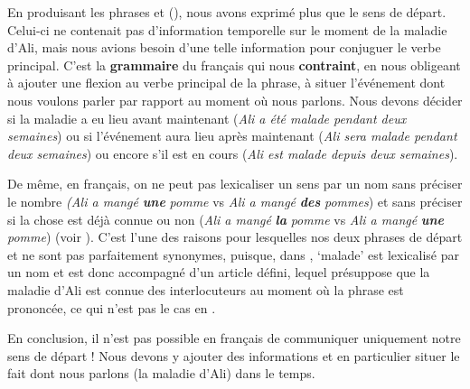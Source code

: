En produisant les phrases  et  (), nous avons exprimé plus que le sens de départ. Celui-ci ne contenait pas d’information temporelle sur le moment de la maladie d’Ali, mais nous avions besoin d’une telle information pour conjuguer le verbe principal. C’est la \textbf{grammaire} du français qui nous \textbf{contraint}, en nous obligeant à ajouter une flexion au verbe principal de la phrase, à situer l’événement dont nous voulons parler par rapport au moment où nous parlons. Nous devons décider si la maladie a eu lieu avant maintenant (\textit{Ali a été malade pendant deux semaines}) ou si l’événement aura lieu après maintenant (\textit{Ali sera malade pendant deux semaines}) ou encore s’il est en cours (\textit{Ali est malade depuis deux semaines}).

De même, en français, on ne peut pas lexicaliser un sens par un nom sans préciser le nombre \textit{(Ali a mangé} \textbf{\textit{une}} \textit{pomme} vs \textit{Ali a mangé} \textbf{\textit{des}} \textit{pommes}) et sans préciser si la chose est déjà connue ou non (\textit{Ali a mangé} \textbf{\textit{la}} \textit{pomme} vs \textit{Ali a mangé} \textbf{\textit{une}} \textit{pomme}) (voir ). C’est l’une des raisons pour lesquelles nos deux phrases de départ  et  ne sont pas parfaitement synonymes, puisque, dans , ‘malade’ est lexicalisé par un nom et est donc accompagné d’un article défini, lequel présuppose que la maladie d’Ali est connue des interlocuteurs au moment où la phrase est prononcée, ce qui n’est pas le cas en .

En conclusion, il n’est pas possible en français de communiquer uniquement notre sens de départ ! Nous devons y ajouter des informations et en particulier situer le fait dont nous parlons (la maladie d’Ali) dans le temps.

